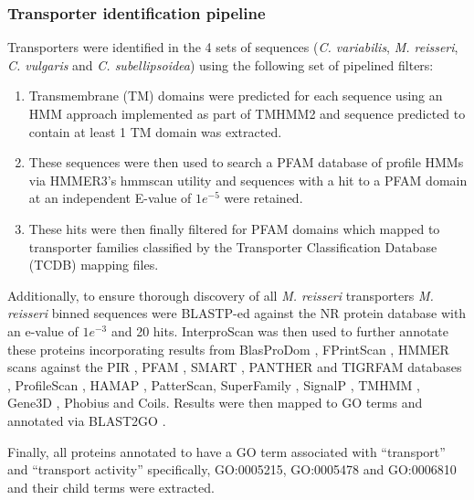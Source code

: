 \subsubsection{Transporter identification pipeline}
Transporters were identified in the 4 sets of sequences (\textit{C. variabilis}, \textit{M. reisseri},
\textit{C. vulgaris} and \textit{C. subellipsoidea}) using the following set of pipelined filters:
\begin{enumerate}
    \item Transmembrane (TM) domains were predicted for each sequence using an HMM approach implemented as part of TMHMM2 \citep{Sonnhammer1998,Krogh2001}
and sequence predicted to contain at least 1 TM domain was extracted.
    \item These sequences were then used to search a PFAM database of profile HMMs \citep{Eddy1998} via HMMER3's hmmscan utility \citep{Eddy1995,Johnson2010,Eddy2011,Mistry2013}
        and sequences with a hit to a PFAM domain at an independent E-value of \(1e^{-5}\) were retained.
    \item These hits were then finally filtered for PFAM domains which mapped to transporter families classified by the Transporter Classification Database (TCDB) \citep{Saier2006,Saier2008,Saier2009,Saier2014}
        mapping files.
\end{enumerate}

Additionally, to ensure thorough discovery of 
all \textit{M. reisseri} transporters \textit{M. reisseri} binned sequences 
were BLASTP-ed against the NR protein database with an e-value of \(1e^{-3}\) and 20 hits.
InterproScan \citep{Zdobnov2001a} was then used to 
further annotate these proteins incorporating
results from BlasProDom \citep{Servant2002}, FPrintScan \citep{Attwood1994}, 
HMMER \citep{Eddy2001} scans against the PIR \citep{Barker1998}, PFAM \citep{Bateman2002}, 
SMART \citep{Schultz1998}, PANTHER \citep{Thomas2003a} and TIGRFAM databases \citep{Haft2003}, 
ProfileScan \citep{Gribskov1988},
HAMAP \citep{Lima2009}, PatterScan, 
SuperFamily \citep{Gough2002}, 
SignalP \citep{Petersen2011}, TMHMM \citep{Sonnhammer1998}, 
Gene3D \citep{Buchan2002}, Phobius \citep{Kall2007}
and Coils. Results were then mapped to GO terms \citep{Ashburner2000,Harris2004}
and annotated via BLAST2GO \citep{Conesa2005a}.

Finally, all proteins annotated to have a GO term associated with ``transport'' and
``transport activity'' specifically, GO:0005215, GO:0005478 and GO:0006810 and their child
terms were extracted.  

